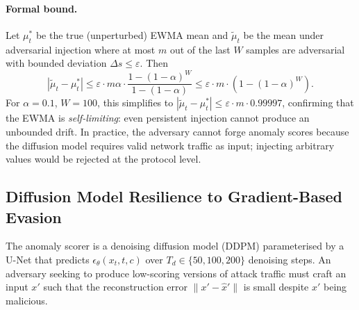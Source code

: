 \documentclass[lettersize,journal]{IEEEtran}
\begin{document}
\paragraph{Formal bound.}
Let $\mu_t^*$ be the true (unperturbed) EWMA mean and $\tilde{\mu}_t$ be
the mean under adversarial injection where at most $m$ out of the last $W$
samples are adversarial with bounded deviation $\Delta s \leq \varepsilon$.
Then
\begin{equation}
|\tilde{\mu}_t - \mu_t^*| \leq \varepsilon \cdot m \alpha
\cdot \frac{1 - (1-\alpha)^W}{1 - (1-\alpha)}
\leq \varepsilon \cdot m \cdot (1 - (1-\alpha)^W).
\label{eq:ewma_bound}
\end{equation}
For $\alpha=0.1$, $W=100$, this simplifies to
$|\tilde{\mu}_t - \mu_t^*| \leq \varepsilon \cdot m \cdot 0.99997$,
confirming that the EWMA is \emph{self-limiting}: even persistent
injection cannot produce an unbounded drift. In practice, the adversary
cannot forge anomaly scores because the diffusion model requires valid
network traffic as input; injecting arbitrary values would be rejected
at the protocol level.

\subsection{Diffusion Model Resilience to Gradient-Based Evasion}
\label{subsec:diffusion_resilience}

The anomaly scorer is a denoising diffusion model (DDPM) parameterised by
a U-Net that predicts $\epsilon_\theta(x_t, t, c)$ over $T_d \in \{50,
100, 200\}$ denoising steps. An adversary seeking to produce
low-scoring versions of attack traffic must craft an input $x'$ such
that the reconstruction error $\|x' - \hat{x}'\|$ is small despite $x'$
being malicious.
\end{document}
